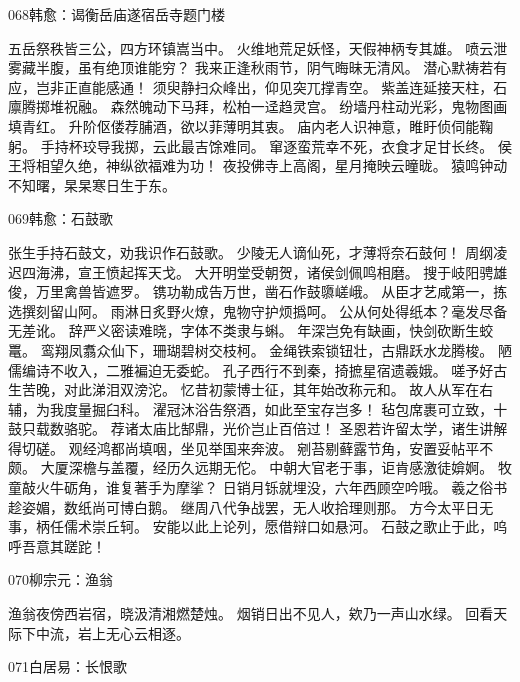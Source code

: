 068韩愈：谒衡岳庙遂宿岳寺题门楼

五岳祭秩皆三公，四方环镇嵩当中。
火维地荒足妖怪，天假神柄专其雄。
喷云泄雾藏半腹，虽有绝顶谁能穷？
我来正逢秋雨节，阴气晦昧无清风。
潜心默祷若有应，岂非正直能感通！
须臾静扫众峰出，仰见突兀撑青空。
紫盖连延接天柱，石廪腾掷堆祝融。
森然魄动下马拜，松柏一迳趋灵宫。
纷墙丹柱动光彩，鬼物图画填青红。
升阶伛偻荐脯酒，欲以菲薄明其衷。
庙内老人识神意，睢盱侦伺能鞠躬。
手持杯珓导我掷，云此最吉馀难同。
窜逐蛮荒幸不死，衣食才足甘长终。
侯王将相望久绝，神纵欲福难为功！
夜投佛寺上高阁，星月掩映云曈昽。
猿鸣钟动不知曙，杲杲寒日生于东。

069韩愈：石鼓歌

张生手持石鼓文，劝我识作石鼓歌。
少陵无人谪仙死，才薄将奈石鼓何！
周纲凌迟四海沸，宣王愤起挥天戈。
大开明堂受朝贺，诸侯剑佩鸣相磨。
搜于岐阳骋雄俊，万里禽兽皆遮罗。
镌功勒成告万世，凿石作鼓隳嵯峨。
从臣才艺咸第一，拣选撰刻留山阿。
雨淋日炙野火燎，鬼物守护烦撝呵。
公从何处得纸本？毫发尽备无差讹。
辞严义密读难晓，字体不类隶与蝌。
年深岂免有缺画，快剑砍断生蛟鼍。
鸾翔凤翥众仙下，珊瑚碧树交枝柯。
金绳铁索锁钮壮，古鼎跃水龙腾梭。
陋儒编诗不收入，二雅褊迫无委蛇。
孔子西行不到秦，掎摭星宿遗羲娥。
嗟予好古生苦晚，对此涕泪双滂沱。
忆昔初蒙博士征，其年始改称元和。
故人从军在右辅，为我度量掘臼科。
濯冠沐浴告祭酒，如此至宝存岂多！
毡包席裹可立致，十鼓只载数骆驼。
荐诸太庙比郜鼎，光价岂止百倍过！
圣恩若许留太学，诸生讲解得切磋。
观经鸿都尚填咽，坐见举国来奔波。
剜苔剔藓露节角，安置妥帖平不颇。
大厦深檐与盖覆，经历久远期无佗。
中朝大官老于事，讵肯感激徒媕婀。
牧童敲火牛砺角，谁复著手为摩挲？
日销月铄就埋没，六年西顾空吟哦。
羲之俗书趁姿媚，数纸尚可博白鹅。
继周八代争战罢，无人收拾理则那。
方今太平日无事，柄任儒术崇丘轲。
安能以此上论列，愿借辩口如悬河。
石鼓之歌止于此，呜呼吾意其蹉跎！

070柳宗元：渔翁

渔翁夜傍西岩宿，晓汲清湘燃楚烛。
烟销日出不见人，欸乃一声山水绿。
回看天际下中流，岩上无心云相逐。

071白居易：长恨歌

